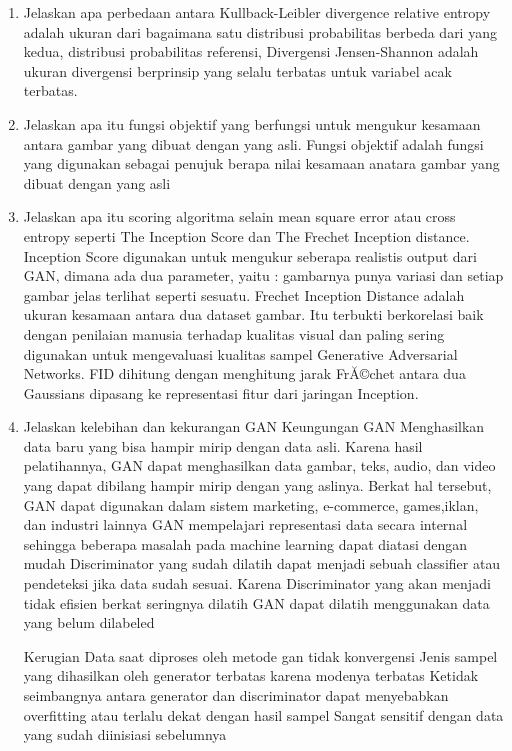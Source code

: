 \begin{enumerate}
\item Jelaskan apa perbedaan antara Kullback-Leibler divergence
relative entropy adalah ukuran dari bagaimana satu distribusi probabilitas berbeda dari yang kedua, distribusi probabilitas referensi, Divergensi Jensen-Shannon adalah ukuran divergensi berprinsip yang selalu terbatas untuk variabel acak terbatas.

\item Jelaskan apa itu fungsi objektif yang berfungsi untuk mengukur kesamaan antara gambar yang dibuat dengan yang asli.
Fungsi objektif adalah fungsi yang digunakan sebagai penujuk berapa nilai kesamaan anatara gambar yang dibuat dengan yang asli

\item Jelaskan apa itu scoring algoritma selain mean square error atau cross entropy seperti The Inception Score dan The Frechet Inception distance.
Inception Score digunakan untuk mengukur seberapa realistis output dari GAN, dimana ada dua parameter, yaitu : gambarnya punya variasi dan setiap gambar jelas terlihat seperti sesuatu. Frechet Inception Distance adalah ukuran kesamaan antara dua dataset gambar. Itu terbukti berkorelasi baik dengan penilaian manusia terhadap kualitas visual dan paling sering digunakan untuk mengevaluasi kualitas sampel Generative Adversarial Networks. FID dihitung dengan menghitung jarak FrĂ©chet antara dua Gaussians dipasang ke representasi fitur dari jaringan Inception.

\item  Jelaskan kelebihan dan kekurangan GAN
Keungungan
GAN Menghasilkan data baru yang bisa hampir mirip dengan data asli. Karena hasil pelatihannya, GAN dapat menghasilkan data gambar, teks, audio, dan video yang dapat dibilang hampir mirip dengan yang aslinya. Berkat hal tersebut, GAN dapat digunakan dalam sistem marketing, e-commerce, games,iklan, dan industri lainnya
GAN mempelajari representasi data secara internal sehingga beberapa masalah pada machine learning dapat diatasi dengan mudah
Discriminator yang sudah dilatih dapat menjadi sebuah classifier atau pendeteksi jika data sudah sesuai. Karena Discriminator yang akan menjadi tidak efisien berkat seringnya dilatih
GAN dapat dilatih menggunakan data yang belum dilabeled

Kerugian
Data saat diproses oleh metode gan tidak konvergensi
Jenis sampel yang dihasilkan oleh generator terbatas karena modenya terbatas
Ketidak seimbangnya antara generator dan discriminator dapat menyebabkan overfitting atau terlalu dekat dengan hasil sampel
Sangat sensitif dengan data yang sudah diinisiasi sebelumnya
\end{enumerate}



